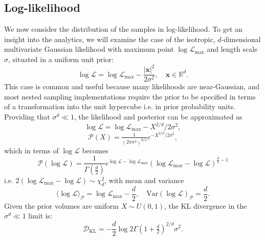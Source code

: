 \documentclass[usenatbib]{mnras}
\newcommand{\Like}{\mathcal{L}}
\newcommand{\logLmax}{\log \Like_\mathrm{max}}
\begin{document}
\subsection{Log-likelihood}\label{sec:logL}
We now consider the distribution of the samples in log-likelihood. To get an insight into the analytics, we will examine the case of the isotropic, $d$-dimensional multivariate Gaussian likelihood with maximum point $\logLmax$ and length scale $\sigma$, situated in a uniform unit prior:
\begin{equation}\label{eq:logL_x}
    \log\Like = \logLmax - \frac{|\bm{x}|^{2}}{2\sigma^{2}}, \quad \bm{x} \in \mathbb{R}^{d}.
\end{equation}
This case is common and useful because many likelihoods are near-Gaussian, and most nested sampling implementations require the prior to be specified in terms of a transformation into the unit hypercube i.e. in prior probability units. Providing that $\sigma^d \ll 1$, the likelihood and posterior can be approximated as
\begin{equation}\label{eq:gaussian_logL}
    \log \Like = \logLmax - X^{2/d}/2\sigma^2,
\end{equation}
\begin{equation}
    \mathcal{P}(X) = \tfrac{1}{(2\pi\sigma^2)^{d/2}} e^{-X^{2/d}/2\sigma^2}, 
    \label{eqn:PX}
\end{equation}
which in terms of $\log\mathcal{L}$ becomes
\begin{equation}
    \mathcal{P}(\log\mathcal{L}) = \frac{1}{\Gamma\left(\frac{d}{2}\right)}e^{\log\mathcal{L}-\log\mathcal{L}_\mathrm{max}} (\log\mathcal{L}_\mathrm{max}-\log\mathcal{L})^{\frac{d}{2}-1}
\end{equation}
i.e. $2(\log\mathcal{L}_\mathrm{max}-\log\mathcal{L}) \sim \chi^2_{d}$, with mean and variance
\begin{equation}
    \langle\log\mathcal{L}\rangle_\mathcal{P} = \log\mathcal{L}_\mathrm{max} - \frac{d}{2},  \quad \mathrm{Var}(\log\mathcal{L})_\mathcal{P} = \frac{d}{2}.
\end{equation}
Given the prior volumes are uniform $X\sim U(0,1)$, the KL divergence in the $\sigma^d \ll 1$ limit is:
\begin{equation}
\mathcal{D}_\mathrm{KL} = -\frac{d}{2}\log 2 \Gamma(1+\tfrac{d}{2})^{2/d} \sigma^2.
\end{equation}
\end{document}
